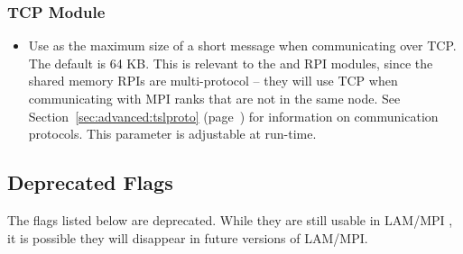 
\subsubsection{TCP  Module}


\begin{itemize}

\item {}
  
  Use  as the maximum size of a short message when
  communicating over TCP.  The default is 64 KB.  This is relevant to
  the  and  RPI modules, since the shared memory
  RPIs are multi-protocol -- they will use TCP when communicating with
  MPI ranks that are not in the same node.  See
  Section~\ref{sec:advanced:tslproto}
  (page~\pageref{sec:advanced:tslproto}) for information on
  communication protocols.  This parameter is adjustable at run-time.

\end{itemize}



\subsection{Deprecated Flags}
\label{sec:configure:deprecated}

The flags listed below are deprecated.  While they are still usable in
LAM/MPI \lamversion, it is possible they will disappear in future
versions of LAM/MPI.

